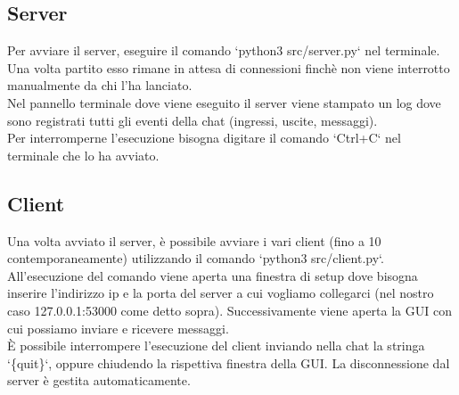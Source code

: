 \documentclass{article}
\begin{document}
\subsection{Server}
Per avviare il server, eseguire il comando `python3 src/server.py` nel terminale. Una volta partito esso rimane in attesa di connessioni finchè non viene interrotto manualmente da chi l'ha lanciato.\\
Nel pannello terminale dove viene eseguito il server viene stampato un log dove sono registrati tutti gli eventi della chat (ingressi, uscite, messaggi).\\
Per interromperne l'esecuzione bisogna digitare il comando `Ctrl+C` nel terminale che lo ha avviato.\\
\subsection{Client}
Una volta avviato il server, è possibile avviare i vari client (fino a 10 contemporaneamente) utilizzando il comando `python3 src/client.py`. All'esecuzione del comando viene aperta una finestra di setup dove bisogna inserire l'indirizzo ip e la porta del server a cui vogliamo collegarci (nel nostro caso 127.0.0.1:53000 come detto sopra). Successivamente viene aperta la GUI con cui possiamo inviare e ricevere messaggi.\\
È possibile interrompere l'esecuzione del client inviando nella chat la stringa `\{quit\}`, oppure chiudendo la rispettiva finestra della GUI. La disconnessione dal server è gestita automaticamente.\\
\end{document}
